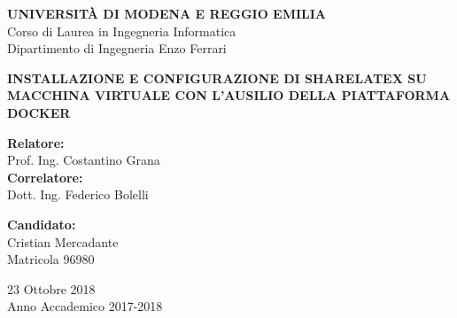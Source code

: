 \thispagestyle{empty}
\vspace*{-1. cm} %
\begin{center}
  \Large
  \textbf{UNIVERSIT\`A DI MODENA E REGGIO EMILIA}\\
  
  \vspace{0.25 cm}
  \large
  Corso di Laurea in Ingegneria Informatica\\
  Dipartimento di Ingegneria Enzo Ferrari\\
  \vspace*{5. cm} \LARGE

  \textbf{INSTALLAZIONE E CONFIGURAZIONE DI SHARELATEX SU MACCHINA VIRTUALE CON L'AUSILIO DELLA PIATTAFORMA DOCKER}\\
  
\end{center}

\vspace*{3.25 cm} \large

\begin{flushleft}
  \textbf{Relatore:}\\
  Prof. Ing. Costantino Grana\\
  \vspace*{0.25 cm}
  \textbf{Correlatore:}\\
  Dott. Ing. Federico Bolelli 
\end{flushleft}

\vspace*{1.5 cm}

\begin{flushright}
  \textbf{Candidato:}\\
  Cristian Mercadante\\
  Matricola 96980
\end{flushright}

\vspace*{2.25 cm}

\begin{center}
  23 Ottobre 2018\\
  Anno Accademico 2017-2018
\end{center} \clearpage

